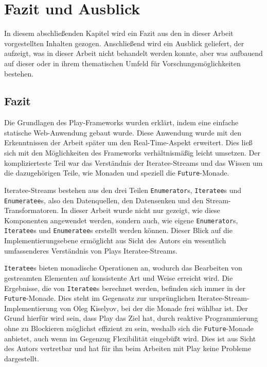
\chapter{Fazit und Ausblick} %
\label{cha:fazit_und_ausblick}

In diesem abschließenden Kapitel wird ein Fazit aus den in dieser Arbeit vorgestellten Inhalten gezogen.
Anschließend wird ein Ausblick geliefert, der aufzeigt, was in dieser Arbeit nicht behandelt werden konnte, aber was aufbauend auf dieser oder in ihrem thematischen Umfeld für Vorschungsmöglichkeiten bestehen.

\section{Fazit} %
\label{sec:fazit}

Die Grundlagen des Play-Frameworks wurden erklärt, indem eine einfache statische Web-Anwendung gebaut wurde.
Diese Anwendung wurde mit den Erkenntnissen der Arbeit später um den Real-Time-Aspekt erweitert.
Dies ließ sich mit den Möglichkeiten des Frameworks verhältnismäßig leicht umsetzen.
Der komplizierteste Teil war das Verständnis der Iteratee-Streams und das Wissen um die dazugehörigen Teile, wie Monaden und speziell die \lstinline|Future|-Monade.

Iteratee-Streams bestehen aus den drei Teilen \lstinline|Enumerator|s, \lstinline|Iteratee|s und \lstinline|Enumeratee|s, also den Datenquellen, den Datensenken und den Stream-Transformatoren.
In dieser Arbeit wurde nicht nur gezeigt, wie diese Komponenten angewendet werden, sondern auch, wie eigene \lstinline|Enumerator|s, \lstinline|Iteratee|s und \lstinline|Enumeratee|s erstellt werden können.
Dieser Blick auf die Implementierungsebene ermöglicht aus Sicht des Autors ein wesentlich umfassenderes Verständnis von Plays Iteratee-Streams.

\lstinline|Iteratee|s bieten monadische Operationen an, wodurch das Bearbeiten von gestreamten Elementen auf konsistente Art und Weise erreicht wird.
Die Ergebnisse, die von \lstinline|Iteratee|s berechnet werden, befinden sich immer in der \lstinline|Future|-Monade.
Dies steht im Gegensatz zur ursprünglichen Iteratee-Stream-Implementierung von Oleg Kiselyov, bei der die Monade frei wählbar ist.
Der Grund hierfür wird sein, dass Play das Ziel hat, durch reaktive Programmierung ohne zu Blockieren möglichst effizient zu sein, weshalb sich die \lstinline|Future|-Monade anbietet, auch wenn im Gegenzug Flexibilität eingebüßt wird.
Dies ist aus Sicht des Autors vertretbar und hat für ihn beim Arbeiten mit Play keine Probleme dargestellt.

